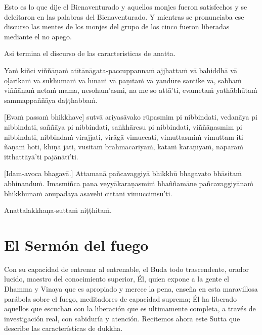 Esto es lo que dije el Bienaventurado y aquellos monjes fueron satisfechos y se deleitaron en las palabras del Bienaventurado. Y mientras se pronunciaba ese discurso las mentes de los monjes del grupo de los cinco fueron liberadas mediante el no apego.

Asi termina el discurso de las caracteristicas de anatta.

\clearpage

\paliText
\markboth{\paliTitle}{\rightmark}

Yaṁ kiñci viññāṇaṁ atītānāgata-paccuppannaṁ ajjhattaṁ vā bahiddhā vā
oḷārikaṁ vā sukhumaṁ vā hīnaṁ vā paṇītaṁ vā yandūre santike vā, sabbaṁ
viññāṇaṁ netaṁ mama, nesoham'asmi, na me so attā'ti, evametaṁ yathābhūtaṁ
sammappaññāya daṭṭhabbaṁ.

[Evaṁ passaṁ bhikkhave] sutvā ariyasāvako rūpasmim pi nibbindati, vedanāya
pi nibbindati, saññāya pi nibbindati, saṅkhāresu pi nibbindati,
viññāṇasmim pi nibbindati, nibbindaṁ virajjati, virāgā vimuccati,
vimuttasmiṁ vimuttam iti ñāṇaṁ hoti, khīṇā jāti, vusitaṁ brahmacariyaṁ,
kataṁ karaṇīyaṁ, nāparaṁ itthattāyā'ti pajānātī'ti.

[Idam-avoca bhagavā.] Attamanā pañcavaggiyā bhikkhū bhagavato bhāsitaṁ
abhinanduṁ. Imasmiñca pana veyyākaraṇasmiṁ bhaññamāne pañcavaggiyānaṁ
bhikkhūnaṁ anupādāya āsavehi cittāni vimucciṁsū'ti.

Anattalakkhaṇa-suttaṁ niṭṭhitaṁ.

\chapterTocDelegatePageNumber
\chapter{El Sermón del fuego}

\setTocDelegatedPageNumber
\englishText
\renewcommand{\englishTitle}{El Sermón del fuego}

\begin{leader}

Con su capacidad de entrenar al entrenable, el Buda todo trascendente, orador lucido, maestro del conocimiento superior,
Él, quien expone a la gente el Dhamma y Vinaya que es apropiado y merece la pena, enseña en esta maravillosa parábola sobre el fuego, meditadores de capacidad suprema;
Él ha liberado aquellos que escuchan con la liberación que es ultimamente completa, a través de investigación real, con sabiduría y atención.
Recitemos ahora este Sutta que describe las características de dukkha.



\end{leader}

